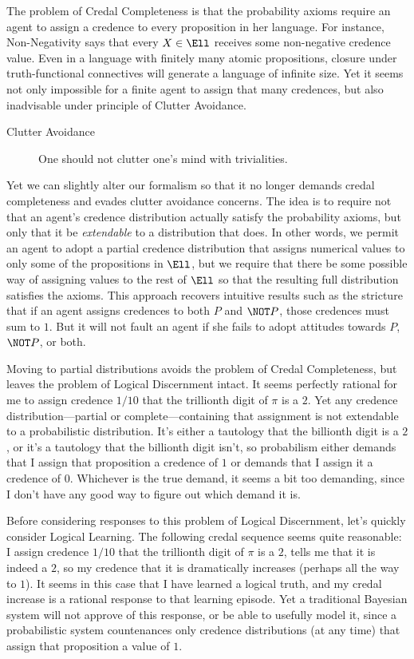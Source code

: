 The problem of Credal Completeness is that the probability axioms require an agent to assign a credence to every proposition in her language. For instance, Non-Negativity says that every $X \in \Ell$ receives some non-negative credence value. Even in a language with finitely many atomic propositions, closure under truth-functional connectives will generate a language of infinite size. Yet it seems not only impossible for a finite agent to assign that many credences, but also inadvisable under  principle of Clutter Avoidance.
\begin{description}
\item[Clutter Avoidance]{One should not clutter one's mind with trivialities.} 
\end{description}
Yet we can slightly alter our formalism so that it no longer demands credal completeness and evades clutter avoidance concerns. The idea is to require not that an agent's credence distribution actually satisfy the probability axioms, but only that it be \emph{extendable} to a distribution that does. In other words, we permit an agent to adopt a partial credence distribution that assigns numerical values to only some of the propositions in $\Ell$, but we require that there be some possible way of assigning values to the rest of $\Ell$ so that the resulting full distribution satisfies the axioms. This approach recovers intuitive results such as the stricture that if an agent assigns credences to both $P$ and $\NOT P$, those credences must sum to $1$. But it will not fault an agent if she fails to adopt attitudes towards $P$, $\NOT P$, or both.

Moving to partial distributions avoids the problem of Credal Completeness, but leaves the problem of Logical Discernment intact. It seems perfectly rational for me to assign credence $1/10$ that the trillionth digit of $\pi$ is a $2$. Yet any credence distribution---partial or complete---containing that assignment is not extendable to a probabilistic distribution. It's either a tautology that the billionth digit is a $2$, or it's a tautology that the billionth digit isn't, so probabilism either demands that I assign that proposition a credence of $1$ or demands that I assign it a credence of $0$. Whichever is the true demand, it seems a bit too demanding, since I don't have any good way to figure out which demand it is.

Before considering responses to this problem of Logical Discernment, let's quickly consider Logical Learning. The following credal sequence seems quite reasonable: I assign credence $1/10$ that the trillionth digit of $\pi$ is a $2$, \citet{TalbottTwoPrinciples} tells me that it is indeed a $2$, so my credence that it is dramatically increases (perhaps all the way to $1$). It seems in this case that I have learned a logical truth, and my credal increase is a rational response to that learning episode. Yet a traditional Bayesian system will not approve of this response, or be able to usefully model it, since a probabilistic system countenances only credence distributions (at any time) that assign that proposition a value of $1$.

